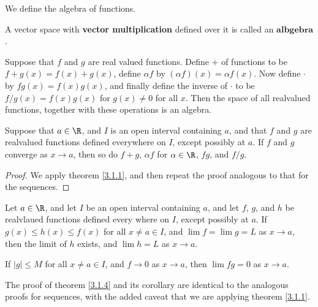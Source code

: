 We define the algebra of functions.

\begin{definition}
    A vector space with \textbf{vector multiplication} defined over it is called 
    an $\textbf{albgebra}$.
\end{definition}

\begin{theorem}\label{3.1.2}
    Suppose that $f$ and  $g$ are real valued functions. Define  $+$ of functions 
    to be $f+g(x)=f(x)+g(x)$, define  $\alpha f$ by $(\alpha f)(x)=\alpha f(x)$. Now 
    define $\cdot$ by  $fg(x)=f(x)g(x)$, and finally define the inverse of $\cdot$ to 
    be  $f/g(x)=f(x)g(x)$ for  $g(x) \neq 0$ for all  $x$. Then the space of all 
    realvalued functions, together with these operations is an algebra.
\end{theorem}

\begin{theorem}\label{3.1.3}
    Suppose that $a \in \R$, and  $I$ is an open interval containing  $a$, and 
    that  $f$ and  $g$ are realvalued functions defined everywhere on $I$, except 
    possibly at  $a$. If $f$ and $g$ converge as  $x \rightarrow a$, then so do 
     $f+g$,  $\alpha f$ for  $\alpha \in \R$, $fg$, and  $f/g$.
\end{theorem}
\begin{proof}
    We apply theorem \ref{3.1.1}, and then repeat the proof analogous to that for 
    the sequences.
\end{proof}

\begin{theorem}\label{3.1.4}
    Let $a \in \R$, and let  $I$ be an open interval containing  $a$, and let  
    $f$, $g$, and  $h$ be realvlaued functions defined every where on  $I$, except 
    possibly at  $a$. If $g(x) \leq h(x) \leq f(x)$ for all  $x \neq a \in I$, 
    and  $\lim{f}=\lim{g}=L$ as $x \rightarrow a$, then the limit of $h$ exists, and 
    $\lim{h}=L$ as  $x \rightarrow a$.
\end{theorem}

\begin{corollary}
    If $|g| \leq M$ for all $x \neq a \in I$, and  $f \rightarrow 0$ as $x \rightarrow a$, 
    then $\lim{fg}=0$ as  $x \rightarrow a$.
\end{corollary}

The proof of theorem \ref{3.1.4} and its corollary are identical to the analogous 
proofs for sequences, with the added caveat that we are applying theorem \ref{3.1.1}.


